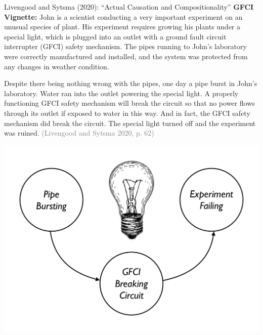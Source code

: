 \documentclass[xcolor=table,9pt,aspectratio=169]{beamer}
\begin{document}
\begin{frame}{\vspace*{10mm}Livengood and Sytsma (2020): ``Actual Causation and Compositionality''}
\vspace*{-5mm}
\textbf{GFCI Vignette:} John is a scientist conducting a very important experiment on an unusual species of plant. His experiment requires growing his plants under a special light, which is plugged into an outlet with a ground fault circuit interrupter (GFCI) safety mechanism. The pipes running to John's laboratory were correctly manufactured and installed, and the system was protected from any changes in weather condition.\par
\hspace{2em}Despite there being nothing wrong with the pipes, one day a pipe burst in John's laboratory. Water ran into the outlet powering the special light. A properly functioning GFCI safety mechanism will break the circuit so that no power flows through its outlet if exposed to water in this way. And in fact, the GFCI safety mechanism did break the circuit. The special light turned off and the experiment was ruined. \textcolor{gray}{(Livengood and Sytsma 2020, p. 62)}
\begin{center}
   \includegraphics[width=0.2\linewidth]{figures/gfci.pdf}
\end{center}
\end{frame}
\end{document}
